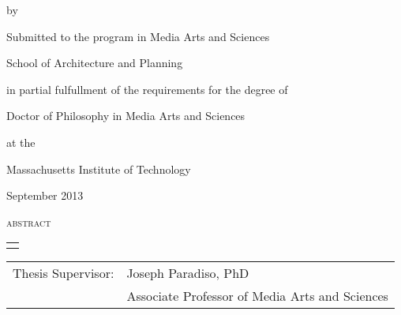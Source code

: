\thispagestyle{empty}

\begingroup
\let\clearpage\relax
\let\cleardoublepage\relax
\let\cleardoublepage\relax

\begin{addmargin}[1cm]{-3cm}
\begin{samepage}
{\centering

    \begingroup
        \color{Maroon}
        {\Large\textsc{\myTitle}}
    \endgroup

    by

    \myName

    \vspace{4mm}

Submitted to the program in Media Arts and Sciences

School of Architecture and Planning

    \vspace{2mm}

in partial fulfullment of the requirements for the degree of

    \vspace{2mm}

Doctor of Philosophy in Media Arts and Sciences

at the

Massachusetts Institute of Technology

    \vspace{2mm}

September 2013



}

{\Large{\textsc{abstract}}}

\begin{tabular}{p{12cm}}
\hline\\
\end{tabular}


{\small

}

\vspace{4mm}
\noindent
\begin{tabular}{rl}
Thesis Supervisor:&Joseph Paradiso, PhD\\
                  &Associate Professor of Media Arts and Sciences
\end{tabular}

\end{samepage}

\end{addmargin}
\endgroup

